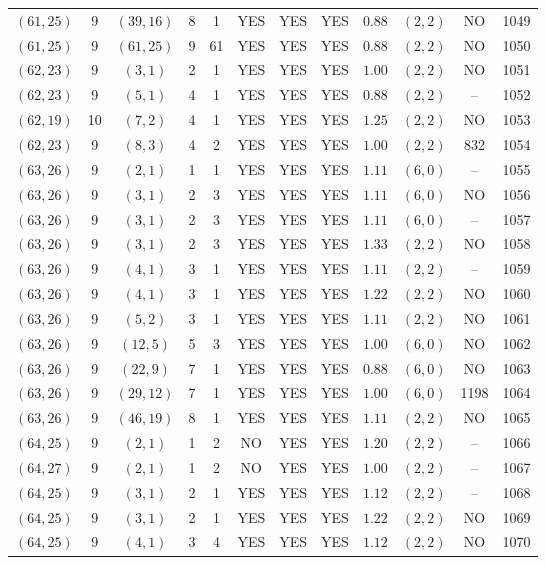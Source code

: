 \begin{longtable}{|c|c|c|c|c|c|c|c|c|c|c|c|}
$(61,25)$ & 9 & $(39,16)$ & 8 & 1 & YES & YES & YES & $0.88$ & $(2,2)$ & NO & 1049\\
$(61,25)$ & 9 & $(61,25)$ & 9 & 61 & YES & YES & YES & $0.88$ & $(2,2)$ & NO & 1050\\
$(62,23)$ & 9 & $(3,1)$ & 2 & 1 & YES & YES & YES & $1.00$ & $(2,2)$ & NO & 1051\\
$(62,23)$ & 9 & $(5,1)$ & 4 & 1 & YES & YES & YES & $0.88$ & $(2,2)$ & -- & 1052\\
$(62,19)$ & 10 & $(7,2)$ & 4 & 1 & YES & YES & YES & $1.25$ & $(2,2)$ & NO & 1053\\
$(62,23)$ & 9 & $(8,3)$ & 4 & 2 & YES & YES & YES & $1.00$ & $(2,2)$ & 832 & 1054\\
$(63,26)$ & 9 & $(2,1)$ & 1 & 1 & YES & YES & YES & $1.11$ & $(6,0)$ & -- & 1055\\
$(63,26)$ & 9 & $(3,1)$ & 2 & 3 & YES & YES & YES & $1.11$ & $(6,0)$ & NO & 1056\\
$(63,26)$ & 9 & $(3,1)$ & 2 & 3 & YES & YES & YES & $1.11$ & $(6,0)$ & -- & 1057\\
$(63,26)$ & 9 & $(3,1)$ & 2 & 3 & YES & YES & YES & $1.33$ & $(2,2)$ & NO & 1058\\
$(63,26)$ & 9 & $(4,1)$ & 3 & 1 & YES & YES & YES & $1.11$ & $(2,2)$ & -- & 1059\\
$(63,26)$ & 9 & $(4,1)$ & 3 & 1 & YES & YES & YES & $1.22$ & $(2,2)$ & NO & 1060\\
$(63,26)$ & 9 & $(5,2)$ & 3 & 1 & YES & YES & YES & $1.11$ & $(2,2)$ & NO & 1061\\
$(63,26)$ & 9 & $(12,5)$ & 5 & 3 & YES & YES & YES & $1.00$ & $(6,0)$ & NO & 1062\\
$(63,26)$ & 9 & $(22,9)$ & 7 & 1 & YES & YES & YES & $0.88$ & $(6,0)$ & NO & 1063\\
$(63,26)$ & 9 & $(29,12)$ & 7 & 1 & YES & YES & YES & $1.00$ & $(6,0)$ & 1198 & 1064\\
$(63,26)$ & 9 & $(46,19)$ & 8 & 1 & YES & YES & YES & $1.11$ & $(2,2)$ & NO & 1065\\
$(64,25)$ & 9 & $(2,1)$ & 1 & 2 & NO & YES & YES & $1.20$ & $(2,2)$ & -- & 1066\\
$(64,27)$ & 9 & $(2,1)$ & 1 & 2 & NO & YES & YES & $1.00$ & $(2,2)$ & -- & 1067\\
$(64,25)$ & 9 & $(3,1)$ & 2 & 1 & YES & YES & YES & $1.12$ & $(2,2)$ & -- & 1068\\
$(64,25)$ & 9 & $(3,1)$ & 2 & 1 & YES & YES & YES & $1.22$ & $(2,2)$ & NO & 1069\\
$(64,25)$ & 9 & $(4,1)$ & 3 & 4 & YES & YES & YES & $1.12$ & $(2,2)$ & NO & 1070\\

\end{longtable}
